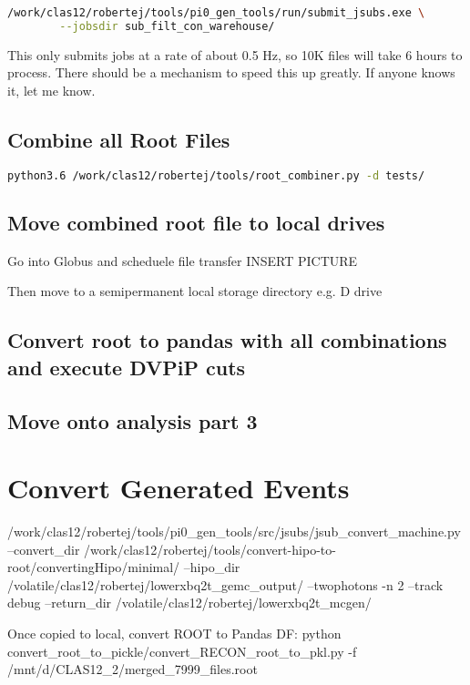         \begin{lstlisting}[language=bash,caption={Submit All Submission Scripts}]
        /work/clas12/robertej/tools/pi0_gen_tools/run/submit_jsubs.exe \
        --jobsdir sub_filt_con_warehouse/
        \end{lstlisting}
        
        This only submits jobs at a rate of about 0.5 Hz, so 10K files will take 6 hours to process. There should be a mechanism to speed this up greatly. If anyone knows it, let me know. 


    \subsection{Combine all Root Files}
    \begin{lstlisting}[language=bash,caption={Root combiner}]
        python3.6 /work/clas12/robertej/tools/root_combiner.py -d tests/
        \end{lstlisting}
     


    \subsection{Move combined root file to local drives}
        Go into Globus and scheduele file transfer
        INSERT PICTURE
        
        Then move to a semipermanent local storage directory e.g. D drive
        
     \subsection{Convert root to pandas with all combinations and execute DVPiP cuts}
     
      \subsection{Move onto analysis part 3}
      
      
     \section{Convert Generated Events}
     /work/clas12/robertej/tools/pi0_gen_tools/src/jsubs/jsub_convert_machine.py --convert_dir /work/clas12/robertej/tools/convert-hipo-to-root/convertingHipo/minimal/ --hipo_dir /volatile/clas12/robertej/lowerxbq2t_gemc_output/ --twophotons -n 2 --track debug --return_dir /volatile/clas12/robertej/lowerxbq2t_mcgen/
     
     
     Once copied to local, convert ROOT to Pandas DF:
     python convert_root_to_pickle/convert_RECON_root_to_pkl.py -f /mnt/d/CLAS12_2/merged_7999_files.root                  
        